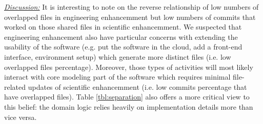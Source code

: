 \documentclass[conference,10pt]{IEEEtran}
\begin{document}
\begin{table}[!t]
\centering
\caption{Given $N$ numbers of projects, the percentage of projects having overlapping percentage above a certain threshold (25\%, 33\%, 50\%) are reported for both Scientific and Engineering development.}\label{tbl:separation}
\footnotesize
{}
\vspace{-10pt}
\end{table} 

\noindent \textit{\underline{Discussion:}}  It is interesting to note on the reverse relationship of low numbers of overlapped files in engineering enhancemment but low numbers of commits that worked on those shared files in scientific enhancemment. We suspected that engineering enhancement also have particular concerns with extending the usability of the software (e.g. put the software in the cloud, add a front-end interface, environment setup) which generate more distinct files (i.e. low overlapped files percentage). Moreover, those types of activities will most likely interact with core modeling part of the software which requires minimal file-related updates of scientific enhancemment (i.e. low commits percentage that have overlapped files). Table \ref{tbl:separation} also offers a more critical view to this belief: the domain logic relies heavily on implementation details more than vice versa.
\end{document}
